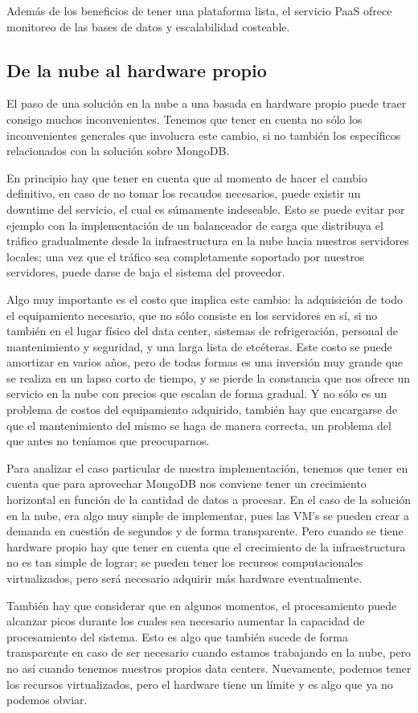 \documentclass[a4paper,10pt,twoside]{article}
\begin{document}
Además de los beneficios de tener una plataforma lista, el servicio PaaS ofrece monitoreo de las bases de datos y escalabilidad costeable.


\subsection{De la nube al hardware propio}

El paso de una solución en la nube a una basada en hardware propio puede traer consigo muchos inconvenientes. Tenemos que tener en cuenta no sólo los inconvenientes generales que involucra este cambio, si no también los específicos relacionados con la solución sobre MongoDB.

En principio hay que tener en cuenta que al momento de hacer el cambio definitivo, en caso de no tomar los recaudos necesarios, puede existir un downtime del servicio, el cual es súmamente indeseable. Esto se puede evitar por ejemplo con la implementación de un balanceador de carga que distribuya el tráfico gradualmente desde la infraestructura en la nube hacia nuestros servidores locales; una vez que el tráfico sea completamente soportado por nuestros servidores, puede darse de baja el sistema del proveedor.

Algo muy importante es el costo que implica este cambio: la adquisición de todo el equipamiento necesario, que no sólo consiste en los servidores en sí, si no también en el lugar físico del data center, sistemas de refrigeración, personal de mantenimiento y seguridad, y una larga lista de etcéteras. Este costo se puede amortizar en varios años, pero de todas formas es una inversión muy grande que se realiza en un lapso corto de tiempo, y se pierde la constancia que nos ofrece un servicio en la nube con precios que escalan de forma gradual. Y no sólo es un problema de costos del equipamiento adquirido, también hay que encargarse de que el mantenimiento del mismo se haga de manera correcta, un problema del que antes no teníamos que preocuparnos.

Para analizar el caso particular de nuestra implementación, tenemos que tener en cuenta que para aprovechar MongoDB nos conviene tener un crecimiento horizontal en función de la cantidad de datos a procesar. En el caso de la solución en la nube, era algo muy simple de implementar, pues las VM's se pueden crear a demanda en cuestión de segundos y de forma transparente. Pero cuando se tiene hardware propio hay que tener en cuenta que el crecimiento de la infraestructura no es tan simple de lograr; se pueden tener los recursos computacionales virtualizados, pero será necesario adquirir más hardware eventualmente.

También hay que considerar que en algunos momentos, el procesamiento puede alcanzar picos durante los cuales sea necesario aumentar la capacidad de procesamiento del sistema. Esto es algo que también sucede de forma transparente en caso de ser necesario cuando estamos trabajando en la nube, pero no así cuando tenemos nuestros propios data centers. Nuevamente, podemos tener los recursos virtualizados, pero el hardware tiene un límite y es algo que ya no podemos obviar.
\end{document}
